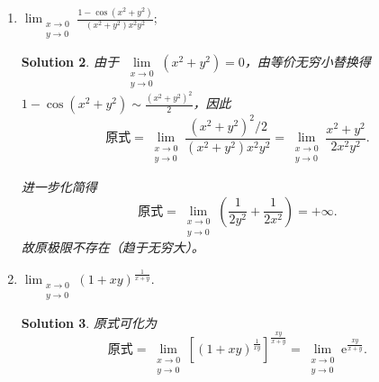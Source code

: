 \documentclass[a4paper,12pt]{article}
\newtheorem*{sol}{Solution}
\begin{document}
\begin{enumerate}
\begin{enumerate}[label=(\arabic*)]
\begin{sol}
                              考虑不同路径：
                              \begin{itemize}
                                    \item 令 $y = 0$，则
                                          $$
                                                \text{原式} = \lim_{x \to 0} \frac{0}{2x} = 0.
                                          $$
                                    
                                    \item 令 $y = x^2 - x$，则
                                          $$
                                                \text{原式} = \lim_{x\to 0} \frac{x(x^2-x)}{2(x + x^2 - x)} = \lim_{x\to 0} \frac{x^3-x^2}{2x^2} = \lim_{x\to 0} \frac{x-1}{2} = -\frac{1}{2}.
                                          $$
                              \end{itemize}
                              
                              由于沿不同路径趋近得到不同的极限值，故原极限不存在。
                        \end{sol}
                  \item $\lim_{\substack{x \to 0 \\ y \to 0}} \frac{1 - \cos(x^2 + y^2)}{(x^2 + y^2)x^2 y^2}$;
                        \begin{sol}
                              由于 $\lim\limits_{\substack{x \to 0 \\ y \to 0}} (x^2 + y^2) = 0$，由等价无穷小替换得 $1 - \cos(x^2 + y^2) \sim \frac{(x^2+y^2)^2}{2}$，因此
                              $$
                                    \text{原式} = \lim_{\substack{x \to 0 \\ y \to 0}} \frac{(x^2+y^2)^2/2}{(x^2 + y^2)x^2 y^2} = \lim_{\substack{x \to 0 \\ y \to 0}} \frac{x^2 + y^2}{2x^2 y^2}.
                              $$
                              
                              进一步化简得
                              $$
                                    \text{原式} = \lim_{\substack{x \to 0 \\ y \to 0}} \left(\frac{1}{2y^2} + \frac{1}{2x^2}\right) = +\infty.
                              $$
                              故原极限不存在（趋于无穷大）。
                        \end{sol}
                  \item $\lim_{\substack{x \to 0 \\ y \to 0}} (1 + xy)^{\frac{1}{x+y}}$.
                        \begin{sol}
                              原式可化为
                              $$
                                    \text{原式} = \lim_{\substack{x \to 0 \\ y \to 0}} \left[(1 + xy)^{\frac{1}{xy}}\right]^{\frac{xy}{x+y}} = \lim_{\substack{x \to 0 \\ y \to 0}} \mathrm{e}^{\frac{xy}{x+y}}.
                              $$
                              

\end{sol}
\end{enumerate}
\end{enumerate}
\end{document}
